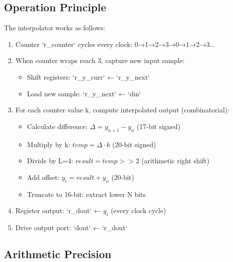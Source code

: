 \documentclass[a4paper,11pt]{article}
\begin{document}
\subsection{Operation Principle}

The interpolator works as follows:
\begin{enumerate}
    \item Counter `r\_counter` cycles every clock: 0→1→2→3→0→1→2→3...
    \item When counter wraps reach 3, capture new input sample:
    \begin{itemize}
        \item Shift registers: `r\_y\_curr` ← `r\_y\_next`
        \item Load new sample: `r\_y\_next` ← `din`
    \end{itemize}
    \item For each counter value k, compute interpolated output (combinatorial):
    \begin{itemize}
        \item Calculate difference: $\Delta = y_{n+1} - y_n$ (17-bit signed)
        \item Multiply by k: $temp = \Delta \cdot k$ (20-bit signed)
        \item Divide by L=4: $result = temp >> 2$ (arithmetic right shift)
        \item Add offset: $y_{i} = result + y_n$ (20-bit)
        \item Truncate to 16-bit: extract lower N bits
    \end{itemize}
    \item Register output: `r\_dout` ← $y_{i}$ (every clock cycle)
    \item Drive output port: `dout` ← `r\_dout`
\end{enumerate}

\subsection{Arithmetic Precision}
\end{document}
